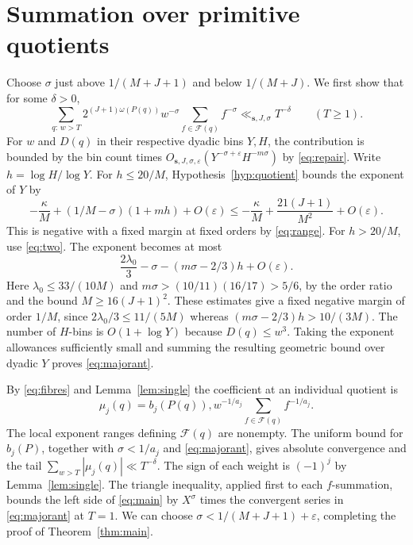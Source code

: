 \documentclass[11pt,reqno]{amsart}
\newcommand{\eps}{\varepsilon}
\newcommand{\sord}{\boldsymbol{s}}
\begin{document}
\section{Summation over primitive quotients}\label{sec:sum}

Choose \(\sigma\) just above \(1/(M+J+1)\) and below
\(1/(M+J)\). We first show that for some \(\delta>0\),
\begin{equation}\label{eq:majorant}
 \sum_{q:\,w>T} 2^{(J+1)\omega(P(q))}w^{-\sigma}
                 \sum_{f\in\mathcal F(q)} f^{-\sigma}
    \ll_{\sord,J,\sigma}T^{-\delta}\qquad(T\ge1).
\end{equation}
For \(w\) and \(D(q)\) in their respective dyadic bins \(Y,H\), the
contribution is bounded by the bin count times
\(O_{\sord,J,\sigma,\eps}(Y^{-\sigma+\eps}H^{-m\sigma})\) by
\eqref{eq:repair}. Write \(h=\log H/\log Y\). For \(h\le20/M\),
Hypothesis~\ref{hyp:quotient} bounds the exponent of \(Y\) by
\[
 -\frac{\kappa}{M}+(1/M-\sigma)(1+mh)+O(\eps)
 \le -\frac{\kappa}{M}+\frac{21(J+1)}{M^2}+O(\eps).
\]
This is negative with a fixed margin at fixed orders by \eqref{eq:range}.
For \(h>20/M\), use \eqref{eq:two}. The exponent becomes at most
\[
  \frac{2\lambda_0}{3}-\sigma-(m\sigma-2/3)h+O(\eps).
\]
Here \(\lambda_0\le 33/(10M)\) and
\(m\sigma>(10/11)(16/17)>5/6\), by the order ratio and the bound
\(M\ge16(J+1)^2\). These estimates give a fixed negative margin
of order \(1/M\), since \(2\lambda_0/3\le 11/(5M)\) whereas
\((m\sigma-2/3)h>10/(3M)\). The number of \(H\)-bins is
\(O(1+\log Y)\) because \(D(q)\le w^3\). Taking the exponent
allowances sufficiently small and summing the resulting geometric
bound over dyadic \(Y\) proves \eqref{eq:majorant}.

By \eqref{eq:fibres} and Lemma~\ref{lem:single} the coefficient at an
individual quotient is
\begin{equation}\label{eq:mu}
 \mu_j(q)= b_j(P(q)),w^{-1/a_j}
                    \sum_{f\in\mathcal F(q)}f^{-1/a_j}.
\end{equation}
The local exponent ranges defining \(\mathcal F(q)\) are nonempty. The
uniform bound for \(b_j(P)\), together with \(\sigma<1/a_j\) and
\eqref{eq:majorant}, gives absolute convergence and the tail
\(\sum_{w>T}|\mu_j(q)|\ll T^{-\delta}\). The sign of each weight is
\((-1)^j\) by Lemma~\ref{lem:single}. The triangle inequality, applied
first to each \(f\)-summation, bounds the left side of \eqref{eq:main}
by \(X^\sigma\) times the convergent series in \eqref{eq:majorant}
at \(T=1\). We can choose \(\sigma<1/(M+J+1)+\eps\), completing the
proof of Theorem~\ref{thm:main}.
\end{document}

